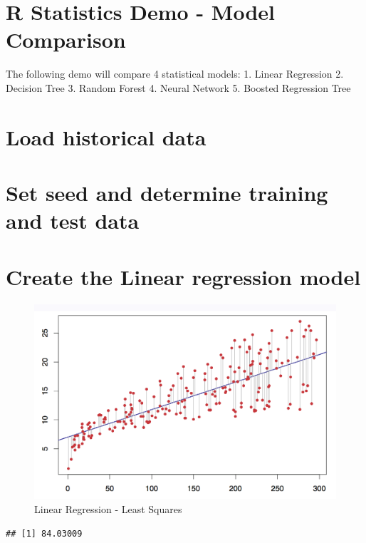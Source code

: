 \documentclass[]{article}
\title{}
\author{}
\date{}
\begin{document}
\section{R Statistics Demo - Model
Comparison}\label{r-statistics-demo---model-comparison}

The following demo will compare 4 statistical models: 1. Linear
Regression 2. Decision Tree 3. Random Forest 4. Neural Network 5.
Boosted Regression Tree

\newpage

\section{Load historical data}\label{load-historical-data}

\section{Set seed and determine training and test
data}\label{set-seed-and-determine-training-and-test-data}

\section{Create the Linear regression
model}\label{create-the-linear-regression-model}

\begin{figure}
\centering
\includegraphics{regression.png}
\caption{Linear Regression - Least Squares}
\end{figure}

\begin{verbatim}
## [1] 84.03009
\end{verbatim}
\end{document}
